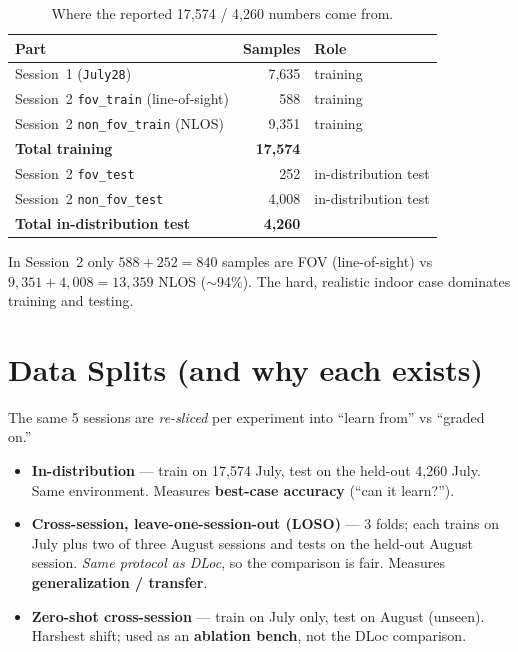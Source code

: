 \documentclass[11pt]{article}
\begin{document}
\begin{table}[h]\centering\footnotesize
\begin{tabular}{@{}lrl@{}}
\toprule
\textbf{Part} & \textbf{Samples} & \textbf{Role} \\
\midrule
Session~1 (\texttt{July28})                    & 7{,}635 & training \\
Session~2 \texttt{fov\_train} (line-of-sight)  & 588     & training \\
Session~2 \texttt{non\_fov\_train} (NLOS)      & 9{,}351 & training \\
\midrule
\textbf{Total training}                        & \textbf{17{,}574} & \\
\midrule
Session~2 \texttt{fov\_test}                    & 252     & in-distribution test \\
Session~2 \texttt{non\_fov\_test}              & 4{,}008 & in-distribution test \\
\midrule
\textbf{Total in-distribution test}            & \textbf{4{,}260} & \\
\bottomrule
\end{tabular}
\caption{Where the reported 17{,}574 / 4{,}260 numbers come from.}
\end{table}

\begin{keybox}
In Session~2 only $588+252=840$ samples are FOV (line-of-sight) vs $9{,}351+4{,}008=13{,}359$ NLOS
($\sim$94\%). The hard, realistic indoor case dominates training and testing.
\end{keybox}

\section{Data Splits (and why each exists)}

The same 5 sessions are \emph{re-sliced} per experiment into ``learn from'' vs ``graded on.''
\begin{itemize}[leftmargin=*]
  \item \textbf{In-distribution} --- train on 17{,}574 July, test on the held-out 4{,}260 July. Same
        environment. Measures \textbf{best-case accuracy} (``can it learn?'').
  \item \textbf{Cross-session, leave-one-session-out (LOSO)} --- 3 folds; each trains on July plus two of
        three August sessions and tests on the held-out August session. \emph{Same protocol as DLoc}, so
        the comparison is fair. Measures \textbf{generalization / transfer}.
  \item \textbf{Zero-shot cross-session} --- train on July only, test on August (unseen). Harshest shift;
        used as an \textbf{ablation bench}, not the DLoc comparison.
\end{itemize}
\end{document}

